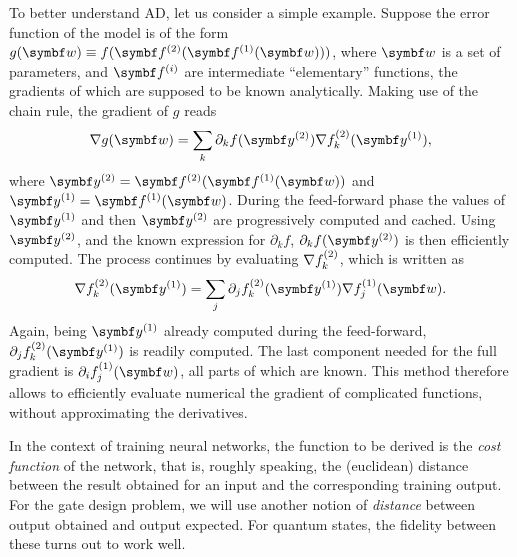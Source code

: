 To better understand \ac{AD}, let us consider a simple example.
Suppose the error function of the model is of the form
$g(\bs w)\equiv f(\bs f^{(2)}(\bs f^{(1)}(\bs w)))$,
where $\bs w$ is a set of parameters, and $\bs f^{(i)}$ are intermediate ``elementary'' functions, the gradients of which are supposed to be known analytically.
Making use of the chain rule, the gradient of $g$ reads
\begin{equation}
\begin{split}
	\grad g(\bs w) =
	\sum_{k} \partial_{k} f(\bs y^{(2)})
	\grad f_{k}^{(2)}(\bs y^{(1)}),
\end{split}
\label{eq:GL:grad_nested_f}
\end{equation}
where $\bs y^{(2)} = \bs f^{(2)}(\bs f^{(1)}(\bs w))$ and
$\bs y^{(1)} = \bs f^{(1)}(\bs w)$.
During the feed-forward phase the values of $\bs y^{(1)}$ and then $\bs y^{(2)}$ are progressively computed and cached.
Using $\bs y^{(2)}$, and the known expression for $\partial_k f$, $\partial_{k} f(\bs y^{(2)})$ is then efficiently computed.
The process continues by evaluating $\nabla f_k^{(2)}$, which is written as
\begin{equation}
	\grad f_k^{(2)}(\bs y^{(1)}) =
	\sum_j \partial_j f_k^{(2)}(\bs y^{(1)}) \grad f_j^{(1)}(\bs w).
\end{equation}
Again, being $\bs y^{(1)}$ already computed during the feed-forward, $\partial_j f_k^{(2)}(\bs y^{(1)})$ is readily computed.
The last component needed for the full gradient is $\partial_i f_j^{(1)}(\bs w)$, all parts of which are known.
This method therefore allows to efficiently evaluate numerical the gradient of complicated functions, without approximating the derivatives.

In the context of training neural networks, the function to be derived is the \emph{cost function} of the network, that is, roughly speaking, the (euclidean) distance between the result obtained for an input and the corresponding training output.
For the gate design problem, we will use another notion of \emph{distance} between output obtained and output expected.
For quantum states, the fidelity between these turns out to work well.

